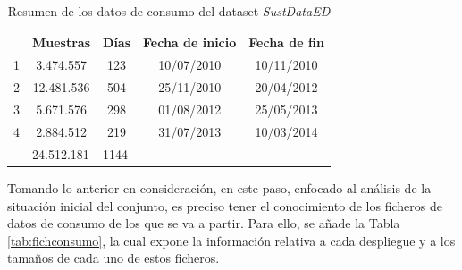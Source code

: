 \begin{table}[h!]
    \centering
    \begin{tabular}{c|c|c|cc}
    \hline
    \rowcolor[HTML]{C0C0C0} 
    \multicolumn{1}{|l|}{\cellcolor[HTML]{C0C0C0}Despliegue} & \multicolumn{1}{l|}{\cellcolor[HTML]{C0C0C0}Muestras} & \multicolumn{1}{l|}{\cellcolor[HTML]{C0C0C0}Días} & \multicolumn{1}{l|}{\cellcolor[HTML]{C0C0C0}Fecha de inicio} & \multicolumn{1}{l|}{\cellcolor[HTML]{C0C0C0}Fecha de fin} \\ \hline
    \multicolumn{1}{|c|}{1} & 3.474.557 & 123 & \multicolumn{1}{c|}{10/07/2010} & \multicolumn{1}{c|}{10/11/2010} \\ \hline
    \multicolumn{1}{|c|}{2} & 12.481.536 & 504 & \multicolumn{1}{c|}{25/11/2010} & \multicolumn{1}{c|}{20/04/2012} \\ \hline
    \multicolumn{1}{|c|}{3} & 5.671.576 & 298 & \multicolumn{1}{c|}{01/08/2012} & \multicolumn{1}{c|}{25/05/2013} \\ \hline
    \multicolumn{1}{|c|}{4} & 2.884.512 & 219 & \multicolumn{1}{c|}{31/07/2013} & \multicolumn{1}{c|}{10/03/2014} \\ \hline
    \multicolumn{1}{l|}{} & \multicolumn{1}{l|}{\cellcolor[HTML]{EFEFEF}24.512.181} & \multicolumn{1}{l|}{\cellcolor[HTML]{EFEFEF}1144} & \multicolumn{1}{l}{} & \multicolumn{1}{l}{} \\ \cline{2-3}
    \end{tabular}
    \caption{Resumen de los datos de consumo del dataset \textit{SustDataED} \cite{sustdata}}
    \label{tab:resumen}
\end{table}

\vspace{3mm}

Tomando lo anterior en consideración, en este paso, enfocado al análisis de la situación inicial del conjunto, es preciso tener el conocimiento de los ficheros de datos de consumo de los que se va a partir. Para ello, se añade la Tabla \ref{tab:fichconsumo}, la cual expone la información relativa a cada despliegue y a los tamaños de cada uno de estos ficheros. 

\vspace{3mm}

